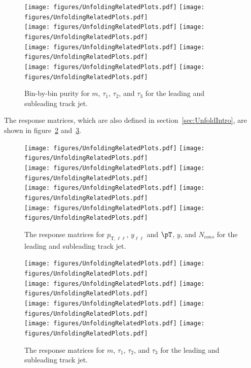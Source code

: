\begin{figure}[h!]
  \centering
  \texttt{[image: figures/UnfoldingRelatedPlots.pdf]}
  \texttt{[image: figures/UnfoldingRelatedPlots.pdf]} \\
  \texttt{[image: figures/UnfoldingRelatedPlots.pdf]}
  \texttt{[image: figures/UnfoldingRelatedPlots.pdf]} \\
  \texttt{[image: figures/UnfoldingRelatedPlots.pdf]}
  \texttt{[image: figures/UnfoldingRelatedPlots.pdf]} \\
  \texttt{[image: figures/UnfoldingRelatedPlots.pdf]}
  \texttt{[image: figures/UnfoldingRelatedPlots.pdf]}
  \caption{Bin-by-bin purity for $m$, $\tau_1$, $\tau_2$, and $\tau_3$ for the leading and subleading track jet.}
  \label{fig:binPur2}
\end{figure}

The response matrices, which are also defined in section~\ref{sec:UnfoldIntro}, are shown in figure~\ref{fig:migMat1} and~\ref{fig:migMat2}.

\begin{figure}[h!]
  \centering
  \texttt{[image: figures/UnfoldingRelatedPlots.pdf]}
  \texttt{[image: figures/UnfoldingRelatedPlots.pdf]} \\
  \texttt{[image: figures/UnfoldingRelatedPlots.pdf]}
  \texttt{[image: figures/UnfoldingRelatedPlots.pdf]} \\
  \texttt{[image: figures/UnfoldingRelatedPlots.pdf]}
  \texttt{[image: figures/UnfoldingRelatedPlots.pdf]} \\
  \texttt{[image: figures/UnfoldingRelatedPlots.pdf]}
  \texttt{[image: figures/UnfoldingRelatedPlots.pdf]}
  \caption{The response matrices for $p_{\text{T},\ell\ell}$, $y_{\ell\ell}$ and $\pT$, $y$, and $N_{cons}$ for the leading and subleading track jet.}
  \label{fig:migMat1}
\end{figure}

\begin{figure}[h!]
  \centering
  \texttt{[image: figures/UnfoldingRelatedPlots.pdf]}
  \texttt{[image: figures/UnfoldingRelatedPlots.pdf]} \\
  \texttt{[image: figures/UnfoldingRelatedPlots.pdf]}
  \texttt{[image: figures/UnfoldingRelatedPlots.pdf]} \\
  \texttt{[image: figures/UnfoldingRelatedPlots.pdf]}
  \texttt{[image: figures/UnfoldingRelatedPlots.pdf]} \\
  \texttt{[image: figures/UnfoldingRelatedPlots.pdf]}
  \texttt{[image: figures/UnfoldingRelatedPlots.pdf]}
  \caption{The response matrices for $m$, $\tau_1$, $\tau_2$, and $\tau_3$ for the leading and subleading track jet.}
  \label{fig:migMat2}
\end{figure}

